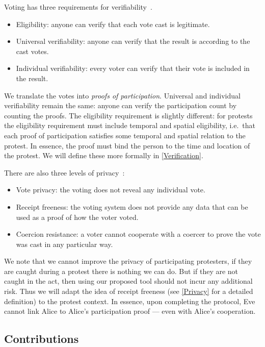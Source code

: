 Voting has three requirements for 
verifiability~\cite{VerifyingPrivacyPropertiesOfVotingProtocols}.
\begin{itemize}
  \item Eligibility: anyone can verify that each vote cast is legitimate.
  \item Universal verifiability: anyone can verify that the result is according 
    to the cast votes.
  \item Individual verifiability: every voter can verify that their vote is 
    included in the result.
\end{itemize}
We translate the votes into \emph{proofs of participation}.
Universal and individual verifiability remain the same: anyone can verify the 
participation count by counting the proofs.
The eligibility requirement is slightly different:
for protests the eligibility requirement must include temporal and spatial 
eligibility, i.e.\ that each proof of participation satisfies some temporal and 
spatial relation to the protest.
In essence, the proof must bind the person to the time and location of the 
protest.
We will define these more formally in \cref{Verification}.

There are also three levels of 
privacy~\cite{VerifyingPrivacyPropertiesOfVotingProtocols}:
\begin{itemize}
  \item\label{VotePrivacy} Vote privacy: the voting does not reveal any 
    individual vote.
  \item\label{ReceiptFreeness} Receipt freeness: the voting system does not 
    provide any data that can be used as a proof of how the voter voted.
  \item\label{CoercionResistance} Coercion resistance: a voter cannot cooperate 
    with a coercer to prove the vote was cast in any particular way.
\end{itemize}
We note that we cannot improve the privacy of participating protesters, if they 
are caught during a protest there is nothing we can do.
But if they are not caught in the act, then using our proposed tool should not 
incur any additional risk.
Thus we will adapt the idea of receipt freeness (see \cref{Privacy} for a 
detailed definition) to the protest context.
In essence, upon completing the protocol, Eve cannot link Alice to Alice's 
participation proof --- even with Alice's cooperation.

\subsection{Contributions}

